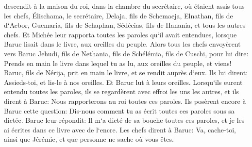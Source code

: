 \verse descendit à la maison du roi, dans la chambre du secrétaire, où étaient assis tous les chefs, Élischama, le secrétaire, Delaja, fils de Schemaeja, Elnathan, fils de d`Acbor, Guemaria, fils de Schaphan, Sédécias, fils de Hanania, et tous les autres chefs. 
\verse Et Michée leur rapporta toutes les paroles qu`il avait entendues, lorsque Baruc lisait dans le livre, aux oreilles du peuple. 
\verse Alors tous les chefs envoyèrent vers Baruc Jehudi, fils de Nethania, fils de Schélémia, fils de Cuschi, pour lui dire: Prends en main le livre dans lequel tu as lu, aux oreilles du peuple, et viens! Baruc, fils de Nérija, prit en main le livre, et se rendit auprès d`eux. 
\verse Ils lui dirent: Assieds-toi, et lis-le à nos oreilles. Et Baruc lut à leurs oreilles. 
\verse Lorsqu`ils eurent entendu toutes les paroles, ils se regardèrent avec effroi les uns les autres, et ils dirent à Baruc: Nous rapporterons au roi toutes ces paroles. 
\verse Ils posèrent encore à Baruc cette question: Dis-nous comment tu as écrit toutes ces paroles sous sa dictée. 
\verse Baruc leur répondit: Il m`a dicté de sa bouche toutes ces paroles, et je les ai écrites dans ce livre avec de l`encre. 
\verse Les chefs dirent à Baruc: Va, cache-toi, ainsi que Jérémie, et que personne ne sache où vous êtes. 

